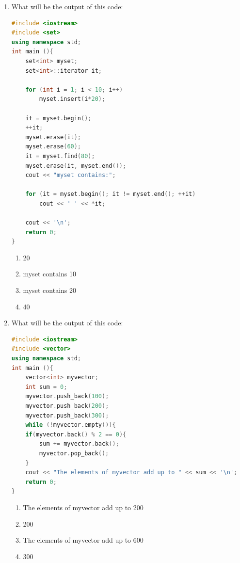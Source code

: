 \documentclass[10pt]{article}
\begin{document}
\begin{enumerate}
\item What will be the output of this code:
\begin{lstlisting}[language=C++]
#include <iostream>
#include <set>
using namespace std;
int main (){
    set<int> myset;
    set<int>::iterator it;

    for (int i = 1; i < 10; i++) 
        myset.insert(i*20);
    
    it = myset.begin();
    ++it;
    myset.erase(it);
    myset.erase(60);
    it = myset.find(80);
    myset.erase(it, myset.end());
    cout << "myset contains:";
    
    for (it = myset.begin(); it != myset.end(); ++it)
        cout << ' ' << *it;
    
    cout << '\n';
    return 0;
}
\end{lstlisting}
\begin{multicols}{4}
\begin{enumerate}
    \item 20
    \item myset contains 10
    \item myset contains 20
    \item 40
\end{enumerate}
\end{multicols}






\item What will be the output of this code:
\begin{lstlisting}[language=C++]
#include <iostream>
#include <vector>
using namespace std;
int main (){
    vector<int> myvector;
    int sum = 0;
    myvector.push_back(100);
    myvector.push_back(200);
    myvector.push_back(300);
    while (!myvector.empty()){
    if(myvector.back() % 2 == 0){
        sum += myvector.back();
        myvector.pop_back();
    }
    cout << "The elements of myvector add up to " << sum << '\n';
    return 0;
}

\end{lstlisting}
\begin{enumerate}
    \item The elements of myvector add up to 200
    \item 200
    \item The elements of myvector add up to 600
    \item 300
\end{enumerate}









\end{enumerate}
\end{document}

